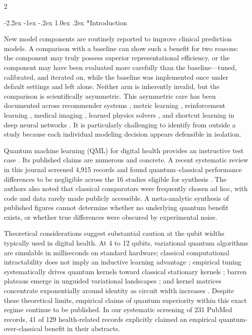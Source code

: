 \documentclass[10pt,a4paper,twoside]{article}
\makeatletter
\renewcommand{\section}{\@startsection{section}{1}{\z@}%
  {-2.2ex \@plus -1ex \@minus -.2ex}%
  {1.0ex \@plus.2ex}%
  {\normalfont\large\sffamily\bfseries\color{naturedark}}}
\makeatother
\begin{document}
\begin{multicols}{2}

\section*{Introduction}

New model components are routinely reported to improve clinical prediction models. A comparison with a baseline can show such a benefit for two reasons: the component may truly possess superior representational efficiency, or the component may have been evaluated more carefully than the baseline---tuned, calibrated, and iterated on, while the baseline was implemented once under default settings and left alone. Neither arm is inherently invalid, but the comparison is scientifically asymmetric. This asymmetric care has been documented across recommender systems \cite{rendle2019}, metric learning \cite{musgrave2020}, reinforcement learning \cite{henderson2018}, medical imaging \cite{glocker2022}, learned physics solvers \cite{kochkov2021}, and shortcut learning in deep neural networks \cite{geirhos2020}. It is particularly challenging to identify from outside a study because each individual modeling decision appears defensible in isolation.

Quantum machine learning (QML) for digital health provides an instructive test case \cite{biamonte2017}. Its published claims are numerous and concrete. A recent systematic review in this journal screened 4,915 records and found quantum--classical performance differences to be negligible across the 16 studies eligible for synthesis \cite{gupta2025}. The authors also noted that classical comparators were frequently chosen ad hoc, with code and data rarely made publicly accessible. A meta-analytic synthesis of published figures cannot determine whether no underlying quantum benefit exists, or whether true differences were obscured by experimental noise.

Theoretical considerations suggest substantial caution at the qubit widths typically used in digital health. At 4 to 12 qubits, variational quantum algorithms \cite{cerezo2021} are simulable in milliseconds on standard hardware; classical computational intractability does not imply an inductive learning advantage \cite{huang2021power}; empirical tuning systematically drives quantum kernels toward classical stationary kernels \cite{kubler2021,shaydulin2022}; barren plateaus emerge in unguided variational landscapes \cite{mcclean2018}; and kernel matrices concentrate exponentially around identity as circuit width increases \cite{thanasilp2023}. Despite these theoretical limits, empirical claims of quantum superiority within this exact regime continue to be published. In our systematic screening of 231 PubMed records, 41 of 129 health-related records explicitly claimed an empirical quantum-over-classical benefit in their abstracts.


\end{multicols}
\end{document}
